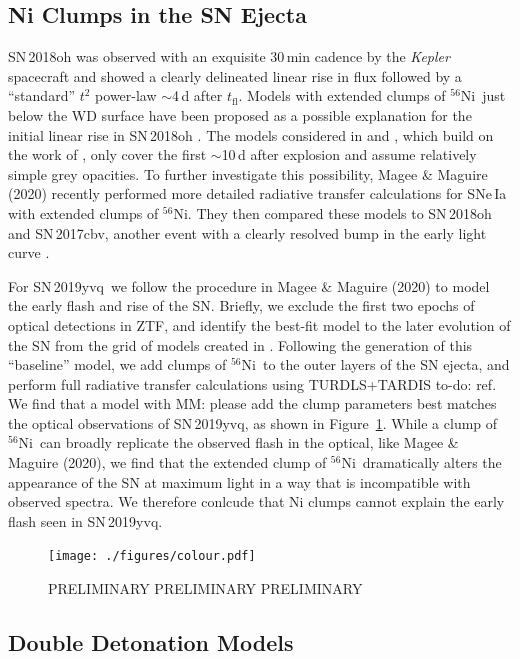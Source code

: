 \documentclass[twocolumn]{aastex63}
\newcommand{\magee}[1]{{\color{Rust} MM: {#1}}}
\newcommand{\todo}[1]{{\color{magenta} to-do: {#1}}}
\newcommand{\tfl}{$t_\mathrm{fl}$}
\newcommand{\radni}{$^{56}$Ni}
\newcommand{\sn}{SN\,2019yvq}
\begin{document}
\subsection{Ni Clumps in the SN Ejecta}

SN\,2018oh was observed with an exquisite 30\,min cadence by the
\textit{Kepler} spacecraft and showed a clearly delineated linear rise in
flux followed by a ``standard'' $t^2$ power-law $\sim$4\,d after \tfl. Models
with extended clumps of \radni\ just below the WD surface have been proposed
as a possible explanation for the initial linear rise in SN\,2018oh
\citep{Shappee19,Dimitriadis19}. The models considered in \citet{Shappee19}
and \citet{Dimitriadis19}, which build on the work of \citet{Piro16}, only
cover the first $\sim$10\,d after explosion and assume relatively simple grey
opacities. To further investigate this possibility, Magee \& Maguire (2020)
recently performed more detailed radiative transfer calculations for SNe\,Ia
with extended clumps of \radni. They then compared these models to SN\,2018oh
and SN\,2017cbv, another event with a clearly resolved bump in the early
light curve \citep{Hosseinzadeh17}.

For \sn\ we follow the procedure in Magee \& Maguire (2020) to model the
early flash and rise of the SN. Briefly, we exclude the first two epochs of
optical detections in ZTF, and identify the best-fit model to the later
evolution of the SN from the grid of models created in \citet{Magee20}.
Following the generation of this ``baseline'' model, we add clumps of \radni\
to the outer layers of the SN ejecta, and perform full radiative transfer
calculations using TURDLS+TARDIS \todo{ref}. We find that a model with
\magee{please add the clump parameters} best matches the optical observations
of \sn, as shown in Figure~\ref{fig:Ni_bullet}. While a clump of \radni\ can
broadly replicate the observed flash in the optical, like Magee \& Maguire
(2020), we find that the extended clump of \radni\ dramatically alters the
appearance of the SN at maximum light in a way that is incompatible with
observed spectra. We therefore conlcude that Ni clumps cannot explain the
early flash seen in \sn.

\begin{figure}
    \centering
    \texttt{[image: ./figures/colour.pdf]}
    \caption{PRELIMINARY PRELIMINARY PRELIMINARY}
    \label{fig:Ni_bullet}
\end{figure}

\subsection{Double Detonation Models}
\end{document}

